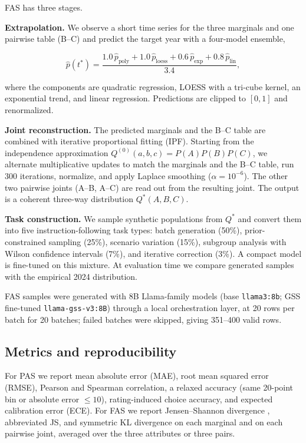 FAS has three stages.

\textbf{Extrapolation.} We observe a short time series for the three
marginals and one pairwise table (B--C) and predict the target year with
a four-model ensemble,

\[
\hat p(t^{\ast}) =
\frac{1.0\,\hat p_{\text{poly}}+1.0\,\hat p_{\text{loess}}+0.6\,\hat p_{\text{exp}}+0.8\,\hat p_{\text{lin}}}{3.4},
\]

where the components are quadratic regression, LOESS with a tri-cube
kernel, an exponential trend, and linear regression. Predictions are
clipped to \([0,1]\) and renormalized.

\textbf{Joint reconstruction.} The predicted marginals and the B--C
table are combined with iterative proportional fitting (IPF). Starting
from the independence approximation \(Q^{(0)}(a,b,c)=P(A)P(B)P(C)\), we
alternate multiplicative updates to match the marginals and the B--C
table, run 300 iterations, normalize, and apply Laplace smoothing
(\(\alpha=10^{-6}\)). The other two pairwise joints (A--B, A--C) are
read out from the resulting joint. The output is a coherent three-way
distribution \(Q^{\ast}(A,B,C)\).

\textbf{Task construction.} We sample synthetic populations from
\(Q^{\ast}\) and convert them into five instruction-following task
types: batch generation (50\%), prior-constrained sampling (25\%),
scenario variation (15\%), subgroup analysis with Wilson confidence
intervals (7\%), and iterative correction (3\%). A compact model is
fine-tuned on this mixture. At evaluation time we compare generated
samples with the empirical 2024 distribution.

FAS samples were generated with 8B Llama-family models (base
\texttt{llama3:8b}; GSS fine-tuned \texttt{llama-gss-v3:8B}) through a
local orchestration layer, at 20 rows per batch for 20 batches; failed
batches were skipped, giving 351--400 valid rows.

\subsection{Metrics and
reproducibility}\label{metrics-and-reproducibility}

For PAS we report mean absolute error (MAE), root mean squared error
(RMSE), Pearson and Spearman correlation, a relaxed accuracy (same
20-point bin or absolute error \(\le 10\)), rating-induced choice
accuracy, and expected calibration error (ECE). For FAS we report
Jensen--Shannon divergence \citep{lin1991js}, abbreviated JS, and
symmetric KL divergence on each marginal and on each pairwise joint,
averaged over the three attributes or three pairs.

